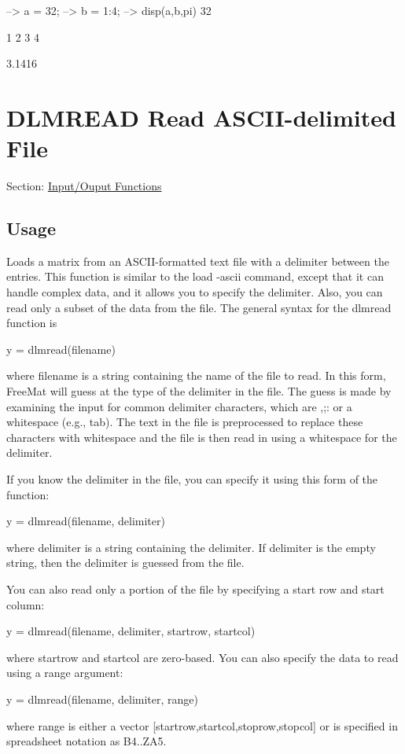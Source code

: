 \begin{DoxyVerbInclude}
--> a = 32;
--> b = 1:4;
--> disp(a,b,pi)
 32 

 1 2 3 4 

    3.1416 
\end{DoxyVerbInclude}
 \hypertarget{io_dlmread}{}\section{D\-L\-M\-R\-E\-A\-D Read A\-S\-C\-I\-I-\/delimited File}\label{io_dlmread}
Section\-: \hyperlink{sec_io}{Input/\-Ouput Functions} \hypertarget{vtkwidgets_vtkxyplotwidget_Usage}{}\subsection{Usage}\label{vtkwidgets_vtkxyplotwidget_Usage}
Loads a matrix from an A\-S\-C\-I\-I-\/formatted text file with a delimiter between the entries. This function is similar to the {\ttfamily load -\/ascii} command, except that it can handle complex data, and it allows you to specify the delimiter. Also, you can read only a subset of the data from the file. The general syntax for the {\ttfamily dlmread} function is \begin{DoxyVerb}    y = dlmread(filename)
\end{DoxyVerb}
 where {\ttfamily filename} is a string containing the name of the file to read. In this form, Free\-Mat will guess at the type of the delimiter in the file. The guess is made by examining the input for common delimiter characters, which are {\ttfamily ,;\-:} or a whitespace (e.\-g., tab). The text in the file is preprocessed to replace these characters with whitespace and the file is then read in using a whitespace for the delimiter.

If you know the delimiter in the file, you can specify it using this form of the function\-: \begin{DoxyVerb}    y = dlmread(filename, delimiter)
\end{DoxyVerb}
 where {\ttfamily delimiter} is a string containing the delimiter. If {\ttfamily delimiter} is the empty string, then the delimiter is guessed from the file.

You can also read only a portion of the file by specifying a start row and start column\-: \begin{DoxyVerb}    y = dlmread(filename, delimiter, startrow, startcol)
\end{DoxyVerb}
 where {\ttfamily startrow} and {\ttfamily startcol} are zero-\/based. You can also specify the data to read using a range argument\-: \begin{DoxyVerb}    y = dlmread(filename, delimiter, range)
\end{DoxyVerb}
 where {\ttfamily range} is either a vector {\ttfamily \mbox{[}startrow,startcol,stoprow,stopcol\mbox{]}} or is specified in spreadsheet notation as {\ttfamily B4..Z\-A5}.

